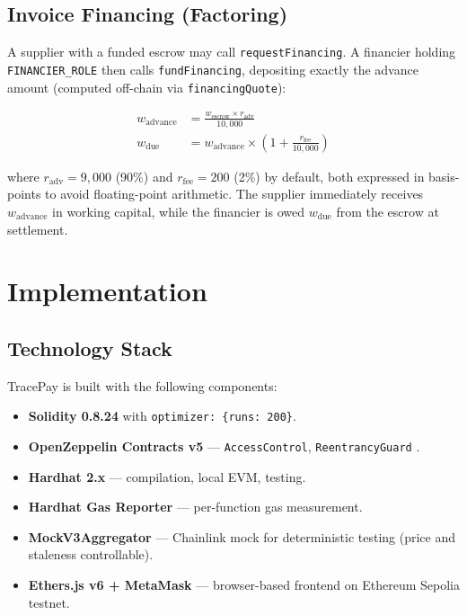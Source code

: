 \documentclass[conference]{IEEEtran}
\begin{document}
\subsection{Invoice Financing (Factoring)}

A supplier with a funded escrow may call \texttt{requestFinancing}.
A financier holding \texttt{FINANCIER\_ROLE} then calls
\texttt{fundFinancing}, depositing exactly the advance amount
(computed off-chain via \texttt{financingQuote}):

\begin{align}
  w_{\text{advance}} &= \frac{w_{\text{escrow}} \times r_{\text{adv}}}{10{,}000}
  \label{eq:advance}\\
  w_{\text{due}}     &= w_{\text{advance}} \times \left(1 + \frac{r_{\text{fee}}}{10{,}000}\right)
  \label{eq:due}
\end{align}

\noindent where $r_{\text{adv}} = 9{,}000$ (90\%) and
$r_{\text{fee}} = 200$ (2\%) by default, both expressed in
basis-points to avoid floating-point arithmetic.
The supplier immediately receives $w_{\text{advance}}$ in working
capital, while the financier is owed $w_{\text{due}}$ from the escrow
at settlement.

\section{Implementation}
\label{sec:impl}

\subsection{Technology Stack}

TracePay is built with the following components:
\begin{itemize}
  \item \textbf{Solidity 0.8.24} with \texttt{optimizer: \{runs: 200\}}.
  \item \textbf{OpenZeppelin Contracts v5} --- \texttt{AccessControl},
        \texttt{ReentrancyGuard} \cite{openzeppelin}.
  \item \textbf{Hardhat 2.x} --- compilation, local EVM, testing.
  \item \textbf{Hardhat Gas Reporter} --- per-function gas measurement.
  \item \textbf{MockV3Aggregator} --- Chainlink mock for deterministic
        testing (price and staleness controllable).
  \item \textbf{Ethers.js v6 + MetaMask} --- browser-based frontend
        on Ethereum Sepolia testnet.
\end{itemize}
\end{document}
